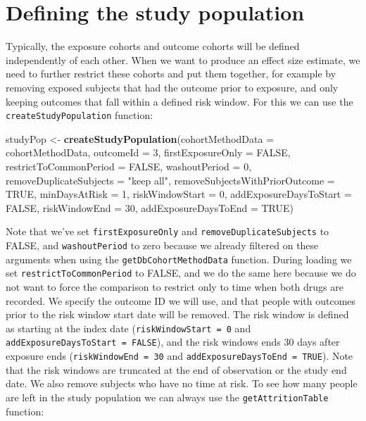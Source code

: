 \documentclass[]{article}
\newenvironment{Shaded}{\begin{snugshade}}{\end{snugshade}}
\newcommand{\DataTypeTok}[1]{\textcolor[rgb]{0.13,0.29,0.53}{#1}}
\newcommand{\DecValTok}[1]{\textcolor[rgb]{0.00,0.00,0.81}{#1}}
\newcommand{\KeywordTok}[1]{\textcolor[rgb]{0.13,0.29,0.53}{\textbf{#1}}}
\newcommand{\NormalTok}[1]{#1}
\newcommand{\OtherTok}[1]{\textcolor[rgb]{0.56,0.35,0.01}{#1}}
\newcommand{\StringTok}[1]{\textcolor[rgb]{0.31,0.60,0.02}{#1}}
\begin{document}
\hypertarget{defining-the-study-population}{%
\section{Defining the study
population}\label{defining-the-study-population}}

Typically, the exposure cohorts and outcome cohorts will be defined
independently of each other. When we want to produce an effect size
estimate, we need to further restrict these cohorts and put them
together, for example by removing exposed subjects that had the outcome
prior to exposure, and only keeping outcomes that fall within a defined
risk window. For this we can use the \texttt{createStudyPopulation}
function:

\begin{Shaded}
\begin{Highlighting}[]
\NormalTok{studyPop <-}\StringTok{ }\KeywordTok{createStudyPopulation}\NormalTok{(}\DataTypeTok{cohortMethodData =}\NormalTok{ cohortMethodData,}
                                  \DataTypeTok{outcomeId =} \DecValTok{3}\NormalTok{,}
                                  \DataTypeTok{firstExposureOnly =} \OtherTok{FALSE}\NormalTok{,}
                                  \DataTypeTok{restrictToCommonPeriod =} \OtherTok{FALSE}\NormalTok{,}
                                  \DataTypeTok{washoutPeriod =} \DecValTok{0}\NormalTok{,}
                                  \DataTypeTok{removeDuplicateSubjects =} \StringTok{"keep all"}\NormalTok{,}
                                  \DataTypeTok{removeSubjectsWithPriorOutcome =} \OtherTok{TRUE}\NormalTok{,}
                                  \DataTypeTok{minDaysAtRisk =} \DecValTok{1}\NormalTok{,}
                                  \DataTypeTok{riskWindowStart =} \DecValTok{0}\NormalTok{,}
                                  \DataTypeTok{addExposureDaysToStart =} \OtherTok{FALSE}\NormalTok{,}
                                  \DataTypeTok{riskWindowEnd =} \DecValTok{30}\NormalTok{,}
                                  \DataTypeTok{addExposureDaysToEnd =} \OtherTok{TRUE}\NormalTok{)}
\end{Highlighting}
\end{Shaded}

Note that we've set \texttt{firstExposureOnly} and
\texttt{removeDuplicateSubjects} to FALSE, and \texttt{washoutPeriod} to
zero because we already filtered on these arguments when using the
\texttt{getDbCohortMethodData} function. During loading we set
\texttt{restrictToCommonPeriod} to FALSE, and we do the same here
because we do not want to force the comparison to restrict only to time
when both drugs are recorded. We specify the outcome ID we will use, and
that people with outcomes prior to the risk window start date will be
removed. The risk window is defined as starting at the index date
(\texttt{riskWindowStart\ =\ 0} and
\texttt{addExposureDaysToStart\ =\ FALSE}), and the risk windows ends 30
days after exposure ends (\texttt{riskWindowEnd\ =\ 30} and
\texttt{addExposureDaysToEnd\ =\ TRUE}). Note that the risk windows are
truncated at the end of observation or the study end date. We also
remove subjects who have no time at risk. To see how many people are
left in the study population we can always use the
\texttt{getAttritionTable} function:
\end{document}

